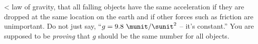  <%
law of gravity, that all falling objects have the same
acceleration if they are dropped at the same location on the
earth and if other forces such as friction are unimportant.
Do not just say, ``$g=9.8\ \munit/\sunit^2$ -- it's constant.''  You
are supposed to be \emph{proving} that $g$ should be the
same number for all objects.
